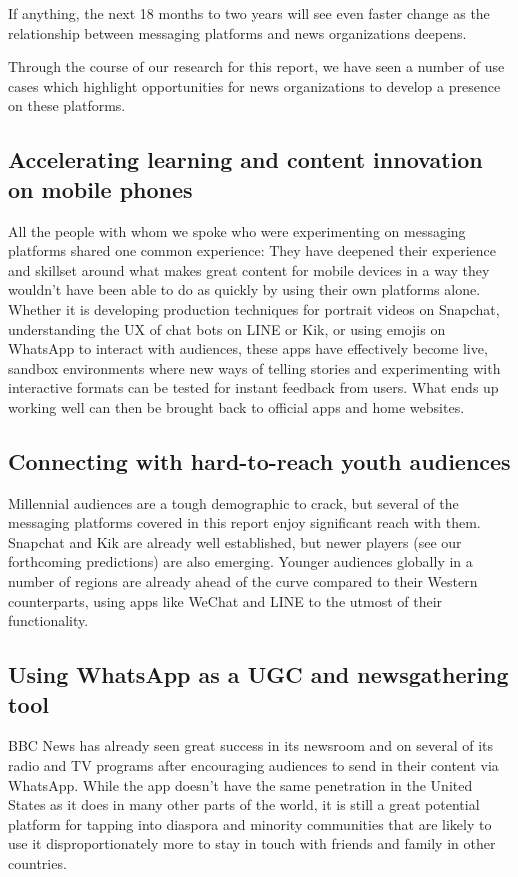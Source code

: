 \documentclass[notoc, symmetric, nobib, nols]{towcenter-guideto-book}
\begin{document}
If anything, the next 18 months to two years will see even faster change as the relationship between messaging platforms and news organizations deepens. 

Through the course of our research for this report, we have seen a number of use cases which highlight opportunities for news organizations to develop a presence on these platforms.

\subsection{Accelerating learning and content innovation on mobile phones}
All the people with whom we spoke who were experimenting on messaging platforms shared one common experience: They have deepened their experience and skillset around what makes great content for mobile devices in a way they wouldn't have been able to do as quickly by using their own platforms alone. Whether it is developing production techniques for portrait videos on Snapchat, understanding the UX of chat bots on LINE or Kik, or using emojis on WhatsApp to interact with audiences, these apps have effectively become live, sandbox environments where new ways of telling stories and experimenting with interactive formats can be tested for instant feedback from users. What ends up working well can then be brought back to official apps and home websites.

\subsection{Connecting with hard-to-reach youth audiences}
Millennial audiences are a tough demographic to crack, but several of the messaging platforms covered in this report enjoy significant reach with them. Snapchat and Kik are already well established, but newer players (see our forthcoming predictions) are also emerging. Younger audiences globally in a number of regions are already ahead of the curve compared to their Western counterparts, using apps like WeChat and LINE to the utmost of their functionality. 

\subsection{Using WhatsApp as a UGC and newsgathering tool} 
BBC News has already seen great success in its newsroom and on several of its radio and TV programs after encouraging audiences to send in their content via WhatsApp. While the app doesn't have the same penetration in the United States as it does in many other parts of the world, it is still a great potential platform for tapping into diaspora and minority communities that are likely to use it disproportionately more to stay in touch with friends and family in other countries.
\end{document}
